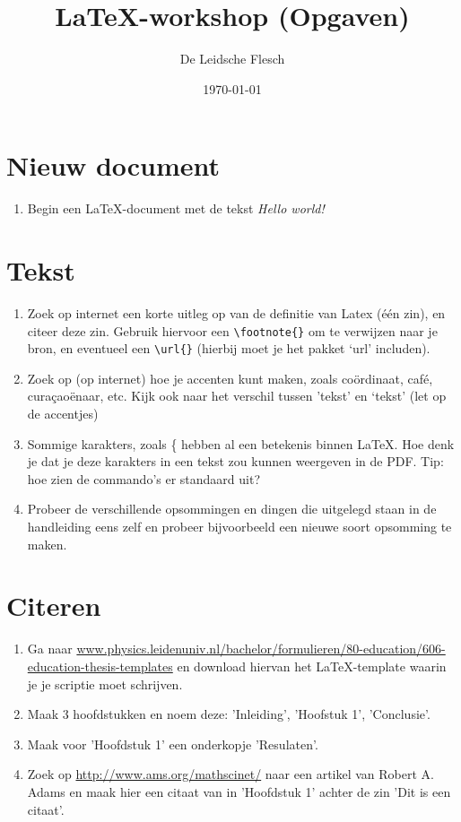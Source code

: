 \documentclass{article}
\begin{document}
\title{\LaTeX-workshop (Opgaven)}
\author{De Leidsche Flesch}
\date{\today}

\maketitle

\section{Nieuw document}
	\begin{enumerate}
		\item Begin een \LaTeX-document met de tekst \emph{Hello world!}
	\end{enumerate}
	
\section{Tekst}
	\begin{enumerate}
		\item Zoek op internet een korte uitleg op van de definitie van Latex (\'e\'en zin), en citeer deze zin. Gebruik hiervoor een \verb+\footnote{}+ om te verwijzen naar je bron, en eventueel een \verb+\url{}+ (hierbij moet je het pakket `url' includen).
		\item Zoek op (op internet) hoe je accenten kunt maken, zoals co\"ordinaat, caf\'e, cura\c{c}ao\"enaar, etc. Kijk ook naar het verschil tussen 'tekst' en `tekst' (let op de accentjes)
		\item Sommige karakters, zoals \{ hebben al een betekenis binnen \LaTeX. Hoe denk je dat je deze karakters in een tekst zou kunnen weergeven in de PDF. Tip: hoe zien de commando's er standaard uit?
		\item Probeer de verschillende opsommingen en dingen die uitgelegd staan in de handleiding eens zelf en probeer bijvoorbeeld een nieuwe soort opsomming te maken.
	\end{enumerate}

\section{Citeren}
\begin{enumerate} 
\item Ga naar \url{www.physics.leidenuniv.nl/bachelor/formulieren/80-education/606-education-thesis-templates} en download hiervan het \LaTeX -template waarin je je scriptie moet schrijven.
\item Maak 3 hoofdstukken en noem deze: 'Inleiding', 'Hoofstuk 1', 'Conclusie'.  
\item Maak voor 'Hoofdstuk 1' een onderkopje 'Resulaten'. 
\item Zoek op \url{http://www.ams.org/mathscinet/} naar een artikel van Robert A. Adams en maak hier een citaat van in 'Hoofdstuk 1' achter de zin 'Dit is een citaat'.    

\end{enumerate}
\end{document}

